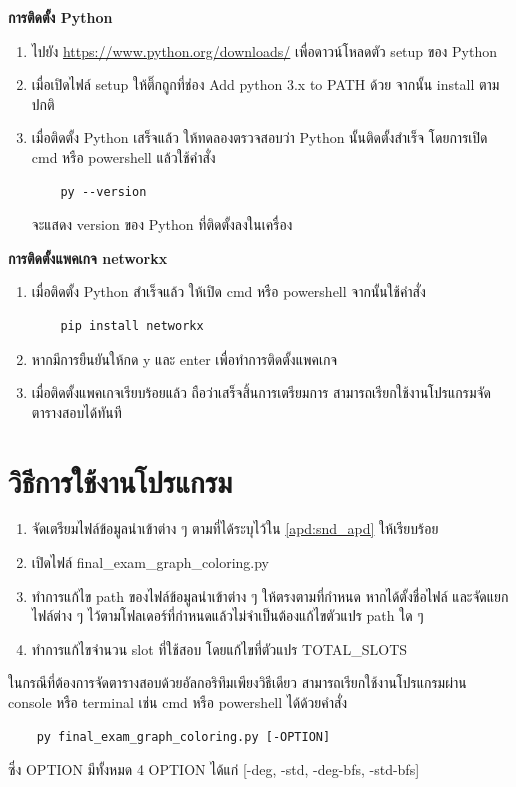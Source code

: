 \textbf{การติดตั้ง Python}
\begin{enumerate}
  \item ไปยัง \url{https://www.python.org/downloads/} เพื่อดาวน์โหลดตัว setup ของ Python
  \item เมื่อเปิดไฟล์ setup ให้ติ๊กถูกที่ช่อง Add python 3.x to PATH ด้วย จากนั้น install ตามปกติ
  \item เมื่อติดตั้ง Python เสร็จแล้ว ให้ทดลองตรวจสอบว่า Python นั้นติดตั้งสำเร็จ โดยการเปิด cmd หรือ powershell แล้วใช้คำสั่ง 
  \begin{verbatim}
    py --version
  \end{verbatim}
  จะแสดง version ของ Python ที่ติดตั้งลงในเครื่อง
\end{enumerate}
\newpage
\textbf{การติดตั้งแพคเกจ networkx}
\begin{enumerate}
  \item เมื่อติดตั้ง Python สำเร็จแล้ว ให้เปิด cmd หรือ powershell จากนั้นใช้คำสั่ง
  \begin{verbatim}
    pip install networkx
  \end{verbatim}
  \item หากมีการยืนยันให้กด y และ enter เพื่อทำการติดตั้งแพคเกจ
  \item เมื่อติดตั้งแพคเกจเรียบร้อยแล้ว ถือว่าเสร็จสิ้นการเตรียมการ สามารถเรียกใช้งานโปรแกรมจัดตารางสอบได้ทันที
\end{enumerate}

\section{วิธีการใช้งานโปรแกรม}
\begin{enumerate}
    \item จัดเตรียมไฟล์ข้อมูลนำเข้าต่าง ๆ ตามที่ได้ระบุไว้ใน \ref{apd:snd_apd} ให้เรียบร้อย
    \item เปิดไฟล์ final\_exam\_graph\_coloring.py
    \item ทำการแก้ไข path ของไฟล์ข้อมูลนำเข้าต่าง ๆ ให้ตรงตามที่กำหนด หากได้ตั้งชื่อไฟล์ และจัดแยกไฟล์ต่าง ๆ ไว้ตามโฟลเดอร์ที่กำหนดแล้วไม่จำเป็นต้องแก้ไขตัวแปร path ใด ๆ
    \item ทำการแก้ไขจำนวน slot ที่ใช้สอบ โดยแก้ไขที่ตัวแปร TOTAL\_SLOTS
\end{enumerate}
ในกรณีที่ต้องการจัดตารางสอบด้วยอัลกอริทึมเพียงวิธีเดียว สามารถเรียกใช้งานโปรแกรมผ่าน console หรือ terminal เช่น cmd หรือ powershell ได้ด้วยคำสั่ง 
\begin{verbatim}
    py final_exam_graph_coloring.py [-OPTION]
\end{verbatim}
ซึ่ง OPTION มีทั้งหมด 4 OPTION ได้แก่ [-deg, -std, -deg-bfs, -std-bfs]

